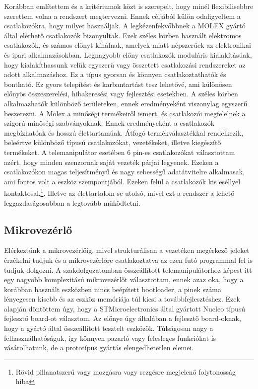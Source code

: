 Korábban említettem és a kritériumok közt is szerepelt, hogy minél flexibilisebbre szerettem volna a rendszert megtervezni. Ennek céljából külön odafigyeltem a csatlakozókra, hogy milyet használjak. A legkézenfekvőbbnek a MOLEX gyártó által elérhető csatlakozók bizonyultak. Ezek széles körben használt elektromos csatlakozók, és számos előnyt kínálnak, amelyek miatt népszerűek az elektronikai és ipari alkalmazásokban. Legnagyobb előny csatlakozók moduláris kialakításúak, hogy kialakíthassunk velük egyszerű vagy összetett csatlakozási rendszereket az adott alkalmazáshoz. Ez a típus gyorsan és könnyen csatlakoztathatók és bontható. Ez gyors telepítést és karbantartást tesz lehetővé, ami különösen előnyös összeszerelési, hibakeresési vagy fejlesztési esetekben. A széles körben alkalmazhatók különböző területeken, ennek eredményeként viszonylag egyszerű beszerezni. A Molex a minőségi termékeiről ismert, és csatlakozói megfelelnek a szigorú minőségi szabványoknak. Ennek eredményeként a csatlakozók megbízhatóak és hosszú élettartamúak. Átfogó termékválasztékkal rendelkezik, beleértve különböző típusú csatlakozókat, vezetékeket, illetve kiegészítő termékeket. A telemanipulátor esetében 6 pin-es csatlakozókat választottam azért, hogy minden szenzornak saját vezeték párjai legyenek. Ezeken a csatlakozókon magas teljesítményű és nagy sebességű adatátvitelre alkalmasak, ami fontos volt a eszköz szempontjából. Ezeken felül a csatlakozók kis eséllyel kontaktosak\footnote{Rövid pillanatszerű vagy mozgásra vagy rezgésre megjelenő folytonosság hiba}. Illetve az élettartalom se utolsó, mivel ezt a rendszer a lehető leggazdaságosabban a legtovább működtetni.


\subsection{Mikrovezérlő}

Elérkeztünk a mikrovezérlőig, mivel strukturálisan a vezetéken megérkező jeleket érzékelni tudjuk és a mikrovezérlőre csatlakoztatva az ezen futó programmal fel is tudjuk dolgozni. A szakdolgozatomban összeállított telemanipulátorhoz képest itt egy nagyobb komplexitású mikrovezérlőt választottam, ennek azaz oka, hogy a korábban használt eszközben nincs beépített bootloader, a pinek száma lényegesen kisebb és az eszköz memóriája túl kicsi a továbbfejlesztéshez. Ezek alapján döntöttem úgy, hogy a STMicroelectronics által gyártott Nucleo típusú fejlesztő board-ot választom. Az előnye úgy általában a fejlesztő board-oknak, hogy a gyártó által összeállított tesztelt eszközök. Túlságosan nagy a felhasználhatóságuk, így könnyen pazarló vagy felesleges funkciókat is vásárolhatunk, de a prototípus gyártás elengedhetetlen elemei.

